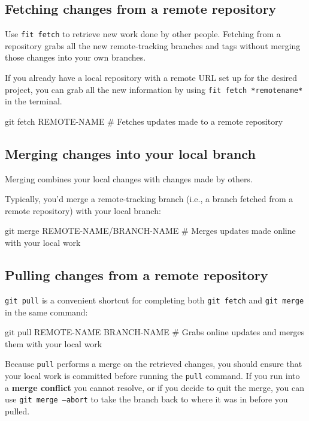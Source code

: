 \subsection{Fetching changes from a remote repository}

Use \texttt{fit fetch} to retrieve new work done by other people. Fetching from a repository grabs all the new remote-tracking branches and tags without merging those changes into your own branches.

If you already have a local repository with a remote URL set up for the desired project, you can grab all the new information by using \texttt{fit fetch *remotename*} in the terminal.

\begin{codeblock}[language=bash]
git fetch REMOTE-NAME 
# Fetches updates made to a remote repository 
\end{codeblock}

\subsection{Merging changes into your local branch}

Merging combines your local changes with changes made by others.

Typically, you'd merge a remote-tracking branch (i.e., a branch fetched from a remote repository) with your local branch:
\begin{codeblock}[language=bash]
git merge REMOTE-NAME/BRANCH-NAME 
# Merges updates made online with your local work 
\end{codeblock}

\subsection{Pulling changes from a remote repository}

\texttt{git pull} is a convenient shortcut for completing both \texttt{git fetch} and \texttt{git merge} in the same command:
\begin{codeblock}[language=bash]
git pull REMOTE-NAME BRANCH-NAME 
# Grabs online updates and merges them with your local work 
\end{codeblock}

Because \texttt{pull} performs a merge on the retrieved changes, you should ensure that your local work is committed before running the \texttt{pull} command. If you run into a \textbf{merge conflict} you cannot resolve, or if you decide to quit the merge, you can use \texttt{git merge --abort} to take the branch back to where it was in before you pulled. 


